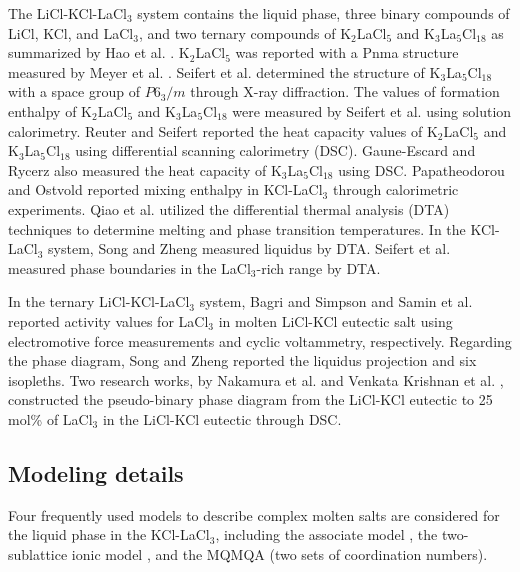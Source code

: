 The LiCl-KCl-LaCl$_3$ system contains the liquid phase, three binary compounds of LiCl, KCl, and LaCl$_3$, and two ternary compounds of K$_2$LaCl$_5$ and K$_3$La$_5$Cl$_{18}$ as summarized by Hao et al. \cite{hao2024thermodynamic}. K$_2$LaCl$_5$ was reported with a Pnma structure measured by Meyer et al. \cite{meyer1983k2mcl5}. Seifert et al. \cite{seifert1985thermodynamic} determined the structure of K$_3$La$_5$Cl$_{18}$ with a space group of $P6_3/m$ through X-ray diffraction. The values of formation enthalpy of K$_2$LaCl$_5$ and K$_3$La$_5$Cl$_{18}$ were measured by Seifert et al. \cite{seifert1985thermodynamic} using solution calorimetry. Reuter and Seifert \cite{reuter1994heat} reported the heat capacity values of K$_2$LaCl$_5$ and K$_3$La$_5$Cl$_{18}$ using differential scanning calorimetry (DSC). Gaune-Escard and Rycerz \cite{gaune1999heat} also measured the heat capacity of K$_3$La$_5$Cl$_{18}$ using DSC. Papatheodorou and Ostvold \cite{papatheodorou1974thermodynamic} reported mixing enthalpy in KCl-LaCl$_3$ through calorimetric experiments. Qiao et al. \cite{qiao1989measurement} utilized the differential thermal analysis (DTA) techniques to determine melting and phase transition temperatures. In the KCl-LaCl$_3$ system, Song and Zheng \cite{song1995investigation} measured liquidus by DTA. Seifert et al. \cite{seifert1985thermodynamic} measured phase boundaries in the LaCl$_3$-rich range by DTA.

In the ternary LiCl-KCl-LaCl$_3$ system, Bagri and Simpson \cite{bagri2016determination} and Samin et al. \cite{samin2016estimation} reported activity values for LaCl$_3$ in molten LiCl-KCl eutectic salt using electromotive force measurements and cyclic voltammetry, respectively. Regarding the phase diagram, Song and Zheng \cite{song1995investigation} reported the liquidus projection and six isopleths. Two research works, by Nakamura et al. \cite{nakamura1997thermal} and Venkata Krishnan et al. \cite{venkata2006pseudo}, constructed the pseudo-binary phase diagram from the LiCl-KCl eutectic to 25 mol\% of LaCl$_3$ in the LiCl-KCl eutectic through DSC.

\subsection{Modeling details} \label{moltensalts:ssec:LaCl3model}
Four frequently used models to describe complex molten salts are considered for the liquid phase in the KCl-LaCl$_3$, including the associate model \cite{sommer1982association}, the two-sublattice ionic model \cite{hillert1985two}, and the MQMQA \cite{pelton2001modified} (two sets of coordination numbers). 


